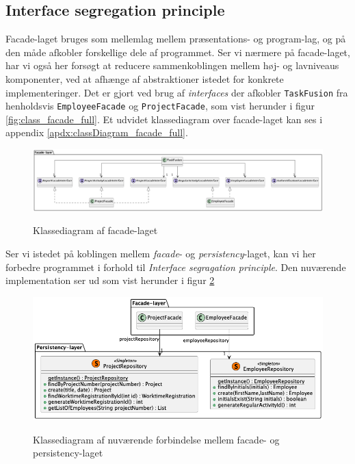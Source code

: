 \subsection{Interface segregation principle} \label{sec:solid_i}
Facade-laget bruges som mellemlag mellem præsentations- og program-lag, og på den måde afkobler forskellige dele af programmet. Ser vi nærmere på facade-laget, har vi også her forsøgt at reducere sammenkoblingen mellem høj- og lavniveaus komponenter, ved at afhænge af abstraktioner istedet for konkrete implementeringer. Det er gjort ved brug af \textit{interfaces} der afkobler \texttt{TaskFusion} fra henholdsvis \texttt{EmployeeFacade} og \texttt{ProjectFacade}, som vist herunder i figur \ref{fig:class_facade_full}. Et udvidet klassediagram over facade-laget kan ses i appendix \ref{apdx:classDiagram_facade_full}.

\begin{figure}[H]
    \centering
    \caption{Klassediagram af facade-laget}
    \includegraphics[width = \textwidth, keepaspectratio]{TaskFusion/out/assets/diagrams/class_facade_layer_simple/ClassDiagram_facade_simple.png}
    \label{fig:class_facade_simple}
\end{figure}

Ser vi istedet på koblingen mellem \textit{facade}- og \textit{persistency}-laget, kan vi her forbedre programmet i forhold til \textit{Interface segragation principle}. Den nuværende implementation ser ud som vist herunder i figur \ref{fig:class_facade_persistency_current}

\begin{figure}[H]
    \centering
    \caption{Klassediagram af nuværende forbindelse mellem facade- og persistency-laget}
    \includegraphics[width = 12cm, keepaspectratio]{TaskFusion/out/assets/diagrams/class_persistency_to_facade/persistency_to_facade_example.png}
    \label{fig:class_facade_persistency_current}
\end{figure}


